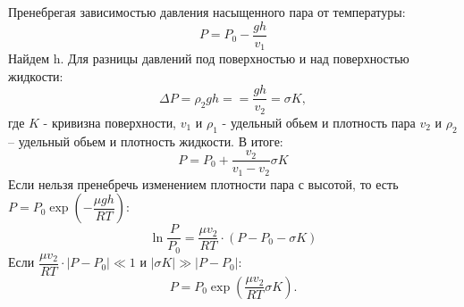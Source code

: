 Пренебрегая зависимостью давления насыщенного пара от температуры:
$$P = P_0 - \frac{ g h}{v_1}$$
Найдем  h. Для разницы давлений под поверхностью и над поверхностью жидкости:
$$\Delta P = \rho_2 g h =  = \frac{ g h}{v_2} = \sigma K, $$
где $K$ - кривизна поверхности, $v_1$ и $\rho_1$ - удельный обьем и плотность пара $v_2$ и $\rho_2$ --  удельный обьем и плотность жидкости.
В итоге:
\begin{equation}
    P = P_0 + \frac{v_2}{v_1 - v_2}\sigma K
\end{equation}
Если нельзя пренебречь изменением плотности пара с высотой, то есть $ P = P_0 \exp \left(- \dfrac {\mu g h }{R T }\right)$:
\begin{equation}
   \ln\frac {P}{P_0} = \frac{\mu v_2}{R T} \cdot (P - P_0 - \sigma K)
\end{equation}
Если  $\dfrac{\mu v_2}{R T} \cdot |P - P_0| \ll 1 $ и $|\sigma K| \gg |P - P_0| $:
\begin{equation}
\boxed{
P = P_0 \exp \left(\dfrac {\mu v_2}{RT} \sigma K\right)
}.
\end{equation}
